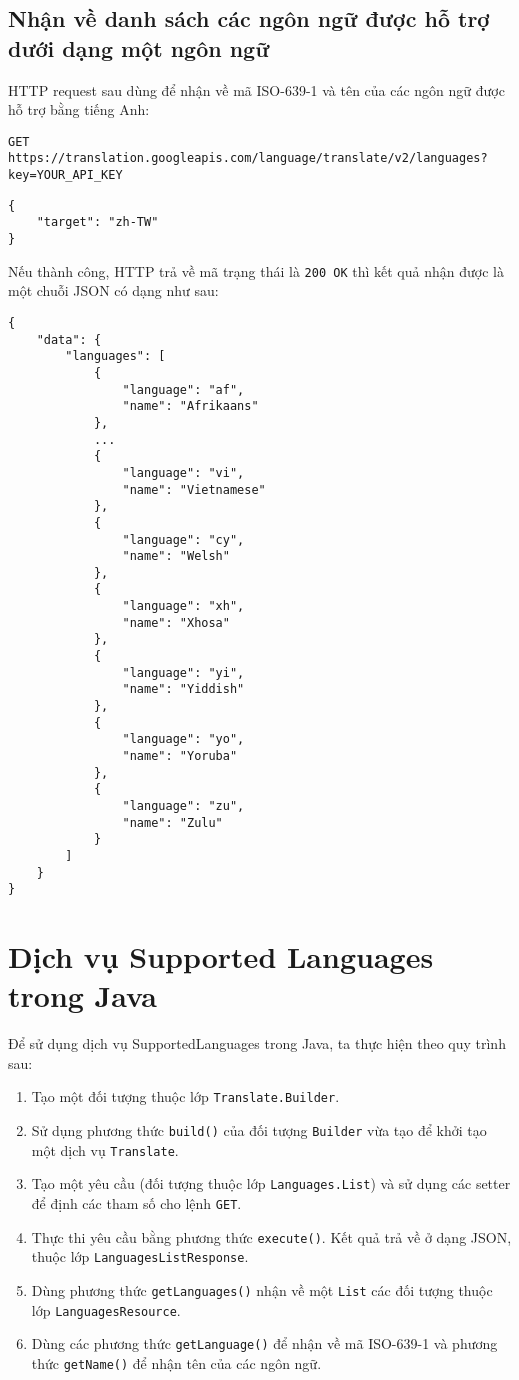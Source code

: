 \documentclass[../thesis.tex]{subfiles}
\begin{document}
\subsection{Nhận về danh sách các ngôn ngữ được hỗ trợ dưới dạng một ngôn ngữ}
HTTP request sau dùng để nhận về mã ISO-639-1 và tên của các ngôn ngữ được hỗ trợ bằng tiếng Anh:
\begin{lstlisting}[style=link]
GET https://translation.googleapis.com/language/translate/v2/languages?key=YOUR_API_KEY
\end{lstlisting}
\begin{lstlisting}[style=link]
{
	"target": "zh-TW"
}
\end{lstlisting}

Nếu thành công, HTTP trả về mã trạng thái là \lstinline{200 OK} thì kết quả nhận được là một chuỗi JSON có dạng như sau:

\begin{lstlisting}[style=link]
{
	"data": {
		"languages": [
			{
				"language": "af",
				"name": "Afrikaans"
			},
			...
			{
				"language": "vi",
				"name": "Vietnamese"
			},
			{
				"language": "cy",
				"name": "Welsh"
			},
			{
				"language": "xh",
				"name": "Xhosa"
			},
			{
				"language": "yi",
				"name": "Yiddish"
			},
			{
				"language": "yo",
				"name": "Yoruba"
			},
			{
				"language": "zu",
				"name": "Zulu"
			}
		]
	}
}
\end{lstlisting}

\section{Dịch vụ Supported Languages trong Java}
Để sử dụng dịch vụ SupportedLanguages trong Java, ta thực hiện theo quy trình sau:
\begin{enumerate}
	\item Tạo một đối tượng thuộc lớp \lstinline{Translate.Builder}.
  	\item Sử dụng phương thức \lstinline{build()} của đối tượng \lstinline{Builder} vừa tạo để khởi tạo một dịch vụ \lstinline{Translate}.
  	\item Tạo một yêu cầu (đối tượng thuộc lớp \lstinline{Languages.List}) và sử dụng các setter để định các tham số cho lệnh \lstinline{GET}.
  	\item Thực thi yêu cầu bằng phương thức \lstinline{execute()}. Kết quả trả về ở dạng JSON, thuộc lớp \lstinline{LanguagesListResponse}.
  	\item Dùng phương thức \lstinline{getLanguages()} nhận về một \lstinline{List} các đối tượng thuộc lớp \lstinline{LanguagesResource}.
  	\item Dùng các phương thức \lstinline{getLanguage()} để nhận về mã ISO-639-1 và phương thức \lstinline{getName()} để nhận tên của các ngôn ngữ.
\end{enumerate}


\end{document}
